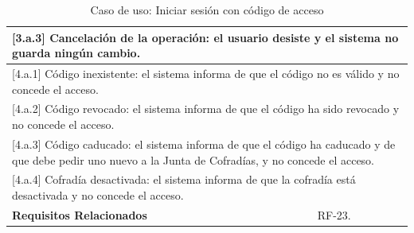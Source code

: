 \begin{table}[h!]
\begin{tabular}{|p{4cm}|p{11cm}|}
        \hline
        \multicolumn{2}{|p{15cm}|}{ [3.a.3] Cancelación de la operación: el usuario desiste y el sistema no guarda ningún cambio. } \\
        \hline
        \multicolumn{2}{|p{15cm}|}{ [4.a.1] Código inexistente: el sistema informa de que el código no es válido y no concede el acceso. } \\
        \hline
        \multicolumn{2}{|p{15cm}|}{ [4.a.2] Código revocado: el sistema informa de que el código ha sido revocado y no concede el acceso. } \\
        \hline
        \multicolumn{2}{|p{15cm}|}{ [4.a.3] Código caducado: el sistema informa de que el código ha caducado y de que debe pedir uno nuevo a la Junta de Cofradías, y no concede el acceso. } \\
        \hline
        \multicolumn{2}{|p{15cm}|}{ [4.a.4] Cofradía desactivada: el sistema informa de que la cofradía está desactivada y no concede el acceso. } \\
        \hline
        \textbf{Requisitos Relacionados} & RF-23. \\
        \hline
    \end{tabular}
    \caption{Caso de uso: Iniciar sesión con código de acceso}
\end{table}

